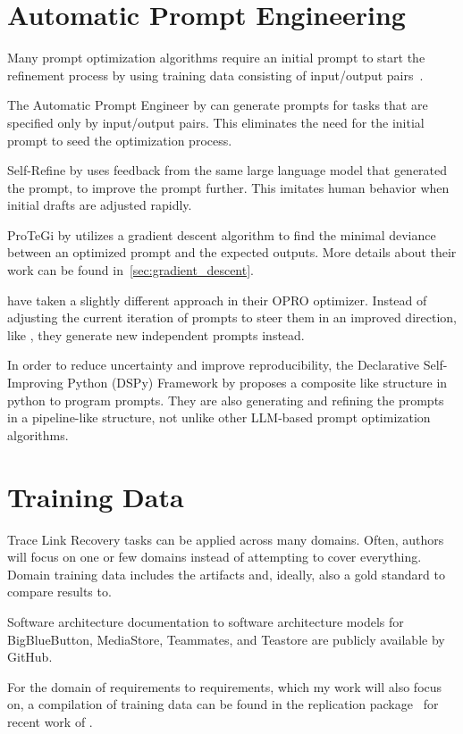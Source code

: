 \section{Automatic Prompt Engineering}
\label{related:sec:ape}
Many prompt optimization algorithms require an initial prompt to start the refinement process by using training data consisting of input/output pairs~\cite{ramnath2025SystematicSurvey}.

The Automatic Prompt Engineer by  can generate prompts for tasks that are specified only by input/output pairs.
This eliminates the need for the initial prompt to seed the optimization process.

Self-Refine by  uses feedback from the same large language model that generated the prompt, to improve the prompt further.
This imitates human behavior when initial drafts are adjusted rapidly.

ProTeGi by  utilizes a gradient descent algorithm to find the minimal deviance between an optimized prompt and the expected outputs.
More details about their work can be found in~\ref{sec:gradient_descent}.

 have taken a slightly different approach in their OPRO optimizer.
Instead of adjusting the current iteration of prompts to steer them in an improved direction, like \citeauthor{pryzant2023AutomaticPrompt}, they generate new independent prompts instead.

In order to reduce uncertainty and improve reproducibility, the Declarative Self-Improving Python (DSPy) Framework by  proposes a composite like structure in python to program prompts.
They are also generating and refining the prompts in a pipeline-like structure, not unlike other LLM-based prompt optimization algorithms.

\section{Training Data}
Trace Link Recovery tasks can be applied across many domains.
Often, authors will focus on one or few domains instead of attempting to cover everything.
Domain training data includes the artifacts and, ideally, also a gold standard to compare results to.

Software architecture documentation to software architecture models for BigBlueButton, MediaStore, Teammates, and Teastore are publicly available by  GitHub.

For the domain of requirements to requirements, which my work will also focus on, a compilation of training data can be found in the replication package~\cite{hey2025ReplicationPackage} for recent work of \citeauthor{hey2025RequirementsTraceability}.